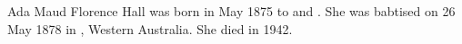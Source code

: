 
Ada Maud Florence Hall was born in May 1875 to  and .
She was babtised on 26 May 1878 in , Western Australia. \cite{AdaHallBabtism}
She died in 1942.
